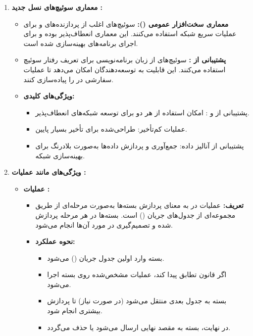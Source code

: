 \begin{qsolve}
\begin{enumerate}
		\item \textbf{معماری سوئیچ‌های نسل جدید :}
		\begin{itemize}
			\item \textbf{معماری سخت‌افزار عمومی ():} سوئیچ‌های  اغلب از پردازنده‌های  و  برای عملیات سریع شبکه استفاده می‌کنند. این معماری انعطاف‌پذیر بوده و برای اجرای برنامه‌های  بهینه‌سازی شده است.
			\item \textbf{پشتیبانی از :} سوئیچ‌های  از زبان برنامه‌نویسی  برای تعریف رفتار سوئیچ استفاده می‌کنند. این قابلیت به توسعه‌دهندگان امکان می‌دهد تا عملیات سفارشی در  را پیاده‌سازی کنند.
			\item \textbf{ویژگی‌های کلیدی:}
			\begin{itemize}
				\item پشتیبانی از  و : امکان استفاده از هر دو برای توسعه شبکه‌های انعطاف‌پذیر.
				\item عملیات کم‌تأخیر: طراحی‌شده برای تأخیر بسیار پایین.
				\item پشتیبانی از آنالیز داده: جمع‌آوری و پردازش داده‌ها به‌صورت بلادرنگ برای بهینه‌سازی شبکه.
			\end{itemize}
		\end{itemize}
		
		\item \textbf{ویژگی‌های  مانند عملیات :}
		\begin{itemize}
			\item \textbf{عملیات :}
			\begin{itemize}
				\item \textbf{تعریف:} عملیات  در  به معنای پردازش بسته‌ها به‌صورت مرحله‌ای از طریق مجموعه‌ای از جدول‌های جریان () است. بسته‌ها در هر مرحله پردازش شده و تصمیم‌گیری در مورد آن‌ها انجام می‌شود.
				\item \textbf{نحوه عملکرد:}
				\begin{itemize}
					\item بسته وارد اولین جدول جریان () می‌شود.
					\item اگر قانون تطابق پیدا کند، عملیات مشخص‌شده روی بسته اجرا می‌شود.
					\item بسته به جدول بعدی منتقل می‌شود (در صورت نیاز) تا پردازش بیشتری انجام شود.
					\item در نهایت، بسته به مقصد نهایی ارسال می‌شود یا حذف می‌گردد.
				\end{itemize}
			\end{itemize}
		\end{itemize}
	\end{enumerate}
\end{qsolve}
\newpage


